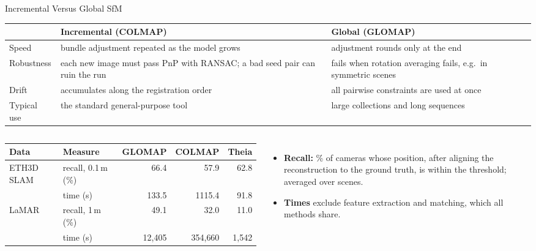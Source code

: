 \begin{frame}{Incremental Versus Global SfM}
  \centering
  {\scriptsize
  \begin{tabular}{>{\raggedright\arraybackslash}p{1.7cm} >{\raggedright\arraybackslash}p{5.2cm} >{\raggedright\arraybackslash}p{5.2cm}}
    \toprule
    & \textbf{Incremental (COLMAP)} & \textbf{Global (GLOMAP)} \\
    \midrule
    Speed & bundle adjustment repeated as the model grows & adjustment rounds only at the end \\
    \addlinespace[0.15em]
    Robustness & each new image must pass PnP with RANSAC; a bad seed pair can ruin the run & fails when rotation averaging fails, e.g.\ in symmetric scenes \\
    \addlinespace[0.15em]
    Drift & accumulates along the registration order & all pairwise constraints are used at once \\
    \addlinespace[0.15em]
    Typical use & the standard general-purpose tool & large collections and long sequences \\
    \bottomrule
  \end{tabular}\par}
  \vspace{0.8em}
  \begin{columns}[T,onlytextwidth]
      \centering
      {\scriptsize\setlength{\tabcolsep}{3pt}
      \begin{tabular}{l l r r r}
        \toprule
        \textbf{Data} & \textbf{Measure} & \textbf{GLOMAP} & \textbf{COLMAP} & \textbf{Theia} \\
        \midrule
        ETH3D SLAM & recall, 0.1\,m (\%) & 66.4 & 57.9 & 62.8 \\
                   & time (s) & 133.5 & 1115.4 & 91.8 \\
        LaMAR & recall, 1\,m (\%) & 49.1 & 32.0 & 11.0 \\
              & time (s) & 12{,}405 & 354{,}660 & 1{,}542 \\
        \bottomrule
      \end{tabular}\par}
      \begin{itemize}\scriptsize\itemsep0.2em
        \item \textbf{Recall:} \% of cameras whose position, after aligning the reconstruction to the ground truth, is within the threshold; averaged over scenes.
        \item \textbf{Times} exclude feature extraction and matching, which all methods share.

\end{itemize}
\end{columns}
\end{frame}
